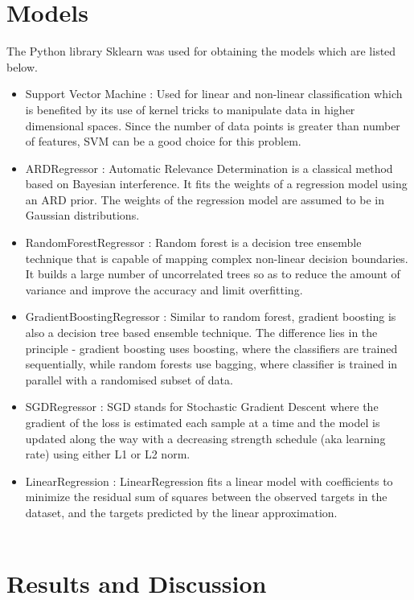 \documentclass[12pt,a4paper]{article}
\begin{document}
\section*{Models}
The Python library Sklearn was used for obtaining the models which are listed below.
\begin{itemize}
    \item Support Vector Machine : Used for linear and non-linear classification which is 
    benefited by its use of kernel tricks to manipulate data in higher dimensional spaces. 
    Since the number of data points is greater than number of features, SVM can be a good choice for
    this problem. 
    \item ARDRegressor : Automatic Relevance Determination is a classical method
    based on Bayesian interference. It fits the weights of a regression model using an ARD prior. The weights of the regression model are assumed to be in Gaussian distributions.
    \item RandomForestRegressor : Random forest is a decision tree ensemble technique that is capable of mapping complex
    non-linear decision boundaries. It builds a large number of uncorrelated trees so as to
    reduce the amount of variance and improve the accuracy and limit overfitting.
    \item GradientBoostingRegressor : Similar to random forest, gradient boosting is also a decision tree based ensemble
    technique. The difference lies in the principle - gradient boosting uses boosting, where
    the classifiers are trained sequentially, while random forests use bagging, where classifier
    is trained in parallel with a randomised subset of data.
    \item SGDRegressor : SGD stands for Stochastic Gradient Descent where the gradient of the loss is estimated each sample at a time and the model is updated along the way with a decreasing strength schedule (aka learning rate) using 
    either L1 or L2 norm.
    \item LinearRegression : LinearRegression fits a linear model with coefficients to minimize the residual sum of squares between the observed targets in the dataset, and the targets predicted by the linear approximation.\\\\
\end{itemize}
\newpage
\section*{Results and Discussion}
\end{document}

